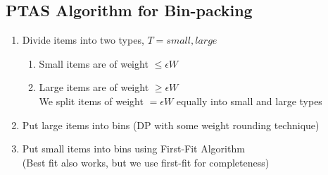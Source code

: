 \documentclass{article}
\begin{document}
\subsection{PTAS Algorithm for Bin-packing}
\begin{enumerate}
	\item Divide items into two types, $T = {small, large}$
	\begin{enumerate}
		\item Small items are of weight $\leq \epsilon W$
		\item Large items are of weight $\geq \epsilon W$ \\ 
		We split items of weight $=\epsilon W$ equally into small and large types 
	\end{enumerate}
	\item Put large items into bins (DP with some weight rounding technique)
	\item Put small items into bins using First-Fit Algorithm\\
	(Best fit also works, but we use first-fit for completeness)
\end{enumerate}
\end{document}
